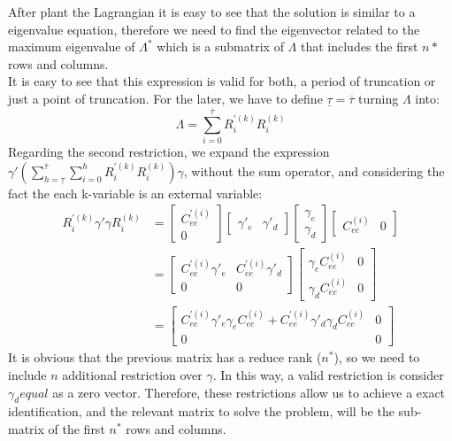\documentclass[12pt, a4paper]{article}
\begin{document}
After plant the Lagrangian it is easy to see that the solution is similar to a eigenvalue equation,  therefore we need to find the eigenvector related to the maximum eigenvalue of $\Lambda^*$ which is a submatrix of $\Lambda$ that includes the first $n*$ rows and columns. \\
It is easy to see that this expression is valid for both, a period of truncation or just a point of truncation. For the later, we have to define $\underline{\tau} = \overline{\tau}$ turning $\Lambda$ into:
\begin{equation*}
\Lambda = \sum_{i=0}^{\overline{\tau}} R^{'(k)}_iR^{(k)}_i 
\end{equation*}
Regarding the second restriction, we expand the expression $\gamma' \left( \sum_{h =\underline{\tau}}^{\overline{\tau}}\sum_{i=0}^h  R_{i}^{'(k)}R_{i}^{(k)} \right) \gamma$, without the sum operator, and considering the fact the each k-variable is an external variable:
\begin{equation*}
\begin{aligned}
R^{'(k)}_i\gamma' \gamma R_i^{(k)} &= \left[ \begin{array}{c}  C_{ee}^{'(i)}  \\ 0 \end{array} \right] \left[ \begin{array}{cc}  \gamma'_e & \gamma'_d  \end{array} \right] \left[ \begin{array}{c}  \gamma_e  \\ \gamma_d  \end{array} \right] 
\left[ \begin{array}{cc}  C_{ee}^{(i)} &  0 \end{array} \right] \\
 &= \left[ \begin{array}{cc} C^{'(i)}_{ee}\gamma'_e & C^{'(i)}_{ee}\gamma'_d  \\ 0 & 0 \end{array} \right]
 \left[ \begin{array}{cc} \gamma_e C^{(i)}_{ee} & 0  \\ \gamma_d C^{(i)}_{ee} & 0 \end{array} \right] \\
 &= \left[ \begin{array}{cc} C^{'(i)}_{ee}\gamma'_e \gamma_e C^{(i)}_{ee} + C^{'(i)}_{ee}\gamma'_d \gamma_d C^{(i)}_{ee}  & 0 \\ 0 & 0 \end{array} \right]
\end{aligned}
\end{equation*}
It is obvious that the previous matrix has a reduce rank ($n^*$), so we need to include $n$ additional restriction over $\gamma$. In this way, a valid restriction is consider $\gamma_d equal$ as a zero vector. Therefore, these restrictions allow us to achieve a exact identification, and the relevant matrix to solve the problem, will be the sub-matrix of the first $n^*$ rows and columns.
\clearpage  
\end{document}
